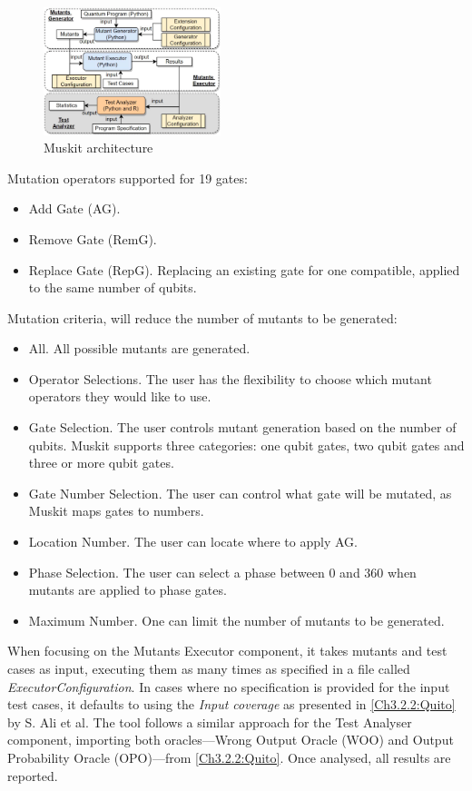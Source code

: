 \begin{itemize}
\begin{figure}[H]
        \centering
        \includegraphics[width=0.46\textwidth]{TFM/photos/MuskitOverview.png}
        \caption{Muskit architecture \cite{mendiluze2021muskit}} 
        \label{Fig:MuskitArch}
\end{figure}

Mutation operators supported for 19 gates:
\begin{itemize}
    \item Add Gate (AG).
    \item Remove Gate (RemG).
    \item Replace Gate (RepG). Replacing an existing gate for one compatible, applied to the same number of qubits.
\end{itemize}

Mutation criteria, will reduce the number of mutants to be generated:
\begin{itemize}
    \item All. All possible mutants are generated.
    \item Operator Selections. The user has the flexibility to choose which mutant operators they would like to use.
    \item Gate Selection. The user controls mutant generation based on the number of qubits. Muskit supports three categories: one qubit gates, two qubit gates and three or more qubit gates. 
    \item Gate Number Selection. The user can control what gate will be mutated, as Muskit maps gates to numbers.
    \item Location Number. The user can locate where to apply AG.
    \item Phase Selection. The user can select a phase between 0 and 360 when mutants are applied to phase gates.
    \item Maximum Number. One can limit the number of mutants to be generated.
\end{itemize}

When focusing on the Mutants Executor component, it takes mutants and test cases as input, executing them as many times as specified in a file called \textit{ExecutorConfiguration}. In cases where no specification is provided for the input test cases, it defaults to using the \textit{Input coverage} as presented in \ref{Ch3.2.2:Quito}\cite{ali2021assessing} by S. Ali et al. The tool follows a similar approach for the Test Analyser component, importing both oracles—Wrong Output Oracle (WOO) and Output Probability Oracle (OPO)—from \ref{Ch3.2.2:Quito}\cite{ali2021assessing}. Once analysed, all results are reported.\newline


\end{itemize}
